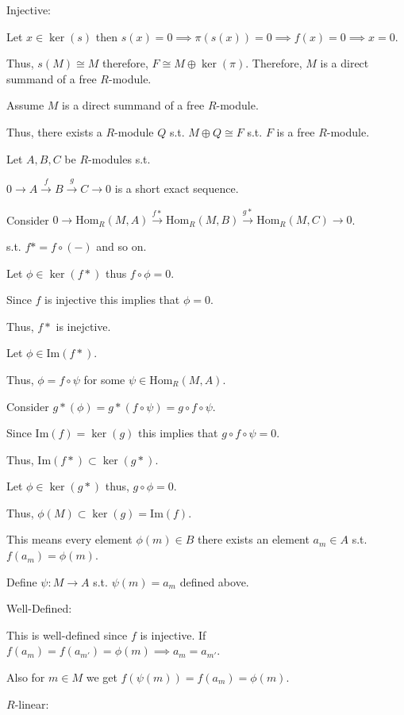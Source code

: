 \documentclass[12pt, letterpaper]{article}
\begin{document}
\begin{problemproof}
    Injective:

    Let $x \in \ker(s)$ then $s(x)=0 \implies \pi(s(x))=0 \implies f(x)=0 \implies x=0$.

    Thus, $s(M) \cong M$ therefore, $F \cong M \oplus \ker(\pi)$. Therefore, $M$ is a direct summand of a free $R$-module.

    Assume $M$ is a direct summand of a free $R$-module.

    Thus, there exists a $R$-module $Q$ s.t. $M \oplus Q \cong F$ s.t. $F$ is a free $R$-module.

    Let $A,B,C$ be $R$-modules s.t.

    $0 \to A \overset{f}{\to} B \overset{g}{\to} C \to 0$ is a short exact sequence.

    Consider $0 \to \mathrm{Hom}_R(M, A) \overset{f*}{\to} \mathrm{Hom}_R(M, B) \overset{g*}{\to} \mathrm{Hom}_R(M, C) \to 0$.

    s.t. $f*=f \circ (-)$ and so on.

    Let $\phi \in \ker(f*)$ thus $f \circ \phi = 0$.

    Since $f$ is injective this implies that $\phi = 0$.

    Thus, $f*$ is inejctive.

    Let $\phi \in \mathrm{Im}(f*)$.

    Thus, $\phi=f \circ \psi$ for some $\psi \in \mathrm{Hom}_R(M,A)$.

    Consider $g*(\phi)=g*(f \circ \psi) = g \circ f \circ \psi$.

    Since $\mathrm{Im}(f) = \ker(g)$ this implies that $g \circ f \circ \psi = 0$.

    Thus, $\mathrm{Im}(f*) \subset \ker(g*)$.

    Let $\phi \in \ker(g*)$ thus, $g \circ \phi = 0$.

    Thus, $\phi(M) \subset \ker(g) = \mathrm{Im}(f)$.

    This means every element $\phi(m) \in B$ there exists an element $a_m \in A$ s.t. $f(a_m)=\phi(m)$.

    Define $\psi : M \to A$ s.t. $\psi(m) = a_m$ defined above.

    Well-Defined:

    This is well-defined since $f$ is injective. If $f(a_m)=f(a_{m'})=\phi(m) \implies a_m = a_{m'}$.

    Also for $m \in M$ we get $f(\psi(m))=f(a_m)=\phi(m)$.
    
    $R$-linear:


\end{problemproof}
\end{document}
